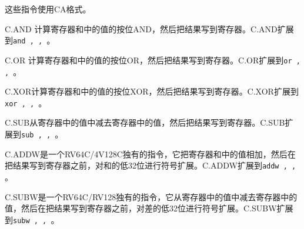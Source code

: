 这些指令使用CA格式。

C.AND 计算寄存器{\em \rdprime}和{\em \rstwoprime}中的值的按位AND，然后把结果写到寄存器{\em \rdprime}。C.AND扩展到{\tt and \rdprime, \rdprime, \rstwoprime}。

C.OR 计算寄存器{\em \rdprime}和{\em \rstwoprime}中的值的按位OR，然后把结果写到寄存器{\em \rdprime}。C.OR扩展到{\tt or \rdprime, \rdprime, \rstwoprime}。

C.XOR计算寄存器{\em \rdprime}和{\em \rstwoprime}中的值的按位XOR，然后把结果写到寄存器{\em \rdprime}。C.XOR扩展到{\tt xor \rdprime, \rdprime, \rstwoprime}。

C.SUB从寄存器{\em \rdprime}中的值中减去寄存器{\em \rstwoprime}中的值，然后把结果写到寄存器{\em \rdprime}。C.SUB扩展到{\tt sub \rdprime, \rdprime, \rstwoprime}。

C.ADDW是一个RV64C/4V128C独有的指令，它把寄存器{\em \rdprime}和{\em \rstwoprime}中的值相加，然后在把结果写到寄存器{\em \rdprime}之前，对和的低32位进行符号扩展。C.ADDW扩展到{\tt addw \rdprime, \rdprime, \rstwoprime}。

C.SUBW是一个RV64C/RV128独有的指令，它从寄存器{\em \rdprime}中的值中减去寄存器{\em \rstwoprime}中的值，然后在把结果写到寄存器{\em \rdprime}之前，对差的低32位进行符号扩展。C.SUBW扩展到{\tt subw \rdprime, \rdprime, \rstwoprime}。

